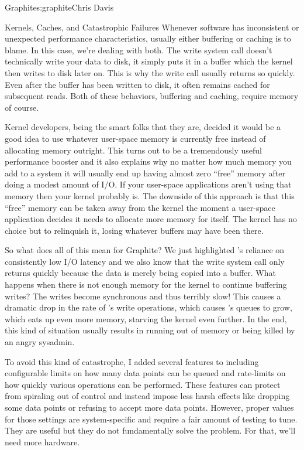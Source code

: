 \begin{aosachapter}{Graphite}{s:graphite}{Chris Davis}
\begin{aosasect1}{Kernels, Caches, and Catastrophic Failures}
Whenever software has inconsistent or unexpected performance
characteristics, usually either buffering or caching is to blame. In
this case, we're dealing with both. The write system call doesn't
technically write your data to disk, it simply puts it in a buffer
which the kernel then writes to disk later on. This is why the write
call usually returns so quickly. Even after the buffer has been
written to disk, it often remains cached for subsequent reads. Both of
these behaviors, buffering and caching, require memory of
course.

Kernel developers, being the smart folks that they are, decided it
would be a good idea to use whatever user-space memory is currently
free instead of allocating memory outright. This turns out to be a
tremendously useful performance booster and it also explains why no
matter how much memory you add to a system it will usually end up
having almost zero ``free'' memory after doing a modest amount of
I/O\@. If your user-space applications aren't using that memory then
your kernel probably is. The downside of this approach is that this
``free'' memory can be taken away from the kernel the moment a
user-space application decides it needs to allocate more memory for
itself. The kernel has no choice but to relinquish it, losing whatever
buffers may have been there.

So what does all of this mean for Graphite? We just highlighted
's reliance on consistently low I/O latency and we also know
that the write system call only returns quickly because the data is
merely being copied into a buffer. What happens when there is not
enough memory for the kernel to continue buffering writes? The writes
become synchronous and thus terribly slow! This causes a dramatic drop
in the rate of 's write operations, which causes 's queues
to grow, which eats up even more memory, starving the kernel even
further. In the end, this kind of situation usually results in 
running out of memory or being killed by an angry sysadmin.

To avoid this kind of catastrophe, I added several features to 
including configurable limits on how many data points can be queued
and rate-limits on how quickly various  operations can be
performed.  These features can protect  from spiraling out of
control and instead impose less harsh effects like dropping some data
points or refusing to accept more data points. However, proper values
for those settings are system-specific and require a fair amount of
testing to tune. They are useful but they do not fundamentally solve
the problem.  For that, we'll need more hardware.


\end{aosasect1}
\end{aosachapter}
